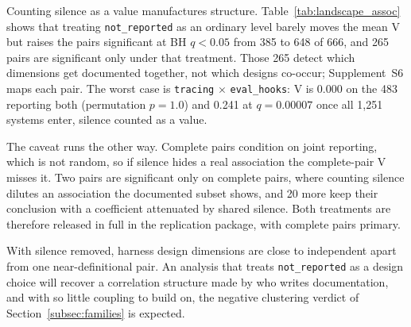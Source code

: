 Counting silence as a value manufactures structure. Table~\ref{tab:landscape_assoc} shows that treating
\texttt{not\_reported} as an ordinary level barely moves the mean V but raises the pairs significant at
BH $q < 0.05$ from 385 to 648 of 666, and 265 pairs are significant only under that treatment. Those 265 detect which
dimensions get documented together, not which designs co-occur; Supplement~S6 maps each pair. The worst case is \texttt{tracing} $\times$
\texttt{eval\_hooks}: V is 0.000 on the 483 reporting both (permutation $p = 1.0$) and 0.241 at
$q = 0.00007$ once all 1,251 systems enter, silence counted as a value.

The caveat runs the other way. Complete pairs condition on joint reporting, which is not random, so if
silence hides a real association the complete-pair V misses it. Two pairs are significant only on
complete pairs, where counting silence dilutes an association the documented subset shows, and 20 more
keep their conclusion with a coefficient attenuated by shared silence. Both treatments are therefore
released in full in the replication package, with complete pairs primary.

With silence removed, harness design dimensions are close to independent apart from one near-definitional
pair. An analysis that treats \texttt{not\_reported} as a design choice will recover a correlation
structure made by who writes documentation, and with so little coupling to build on, the negative
clustering verdict of Section~\ref{subsec:families} is expected.
